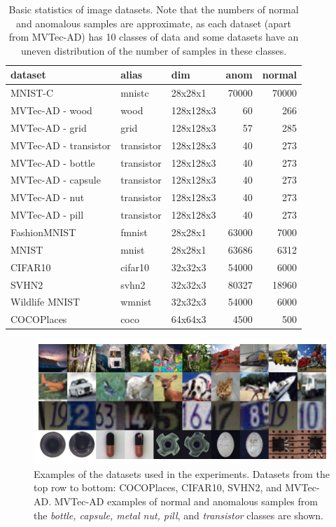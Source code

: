 \begin{table}
    \centering
    \tabcolsep=0.1cm
    \begin{tabular}{lllrr}
    \toprule
    \textbf{dataset} & \textbf{alias} & \textbf{dim} & \textbf{anom} & \textbf{normal} \\
    \midrule
    MNIST-C & mnistc & 28x28x1 & 70000 & 70000 \\
    MVTec-AD - wood & wood & 128x128x3 & 60 & 266 \\
    MVTec-AD - grid & grid & 128x128x3 & 57 & 285 \\
    MVTec-AD - transistor & transistor & 128x128x3 & 40 & 273 \\
    MVTec-AD - bottle & transistor & 128x128x3 & 40 & 273 \\
    MVTec-AD - capsule & transistor & 128x128x3 & 40 & 273 \\
    MVTec-AD - nut & transistor & 128x128x3 & 40 & 273 \\
    MVTec-AD - pill & transistor & 128x128x3 & 40 & 273 \\
    FashionMNIST & fmnist & 28x28x1 & 63000 & 7000   \\
    MNIST & mnist & 28x28x1 & 63686 & 6312  \\
    CIFAR10 & cifar10 & 32x32x3 & 54000 & 6000  \\
    SVHN2 & svhn2 & 32x32x3 & 80327 & 18960  \\
    Wildlife MNIST & wmnist & 32x32x3 & 54000 & 6000  \\
    COCOPlaces & coco & 64x64x3 & 4500 & 500  \\\bottomrule
    \end{tabular}
    \vspace*{0.15cm}
    \caption{Basic statistics of image datasets. Note that the numbers of normal and anomalous samples are approximate, as each dataset (apart from MVTec-AD) has 10 classes of data and some datasets have an uneven distribution of the number of samples in these classes.}
    \label{tab:image_datasets}
\end{table}
    

\begin{figure}
    \centering
    \includegraphics[width=\textwidth]{data/chapter_sgvaegan/fig5_all_grid.png}
    \caption{Examples of the datasets used in the experiments. Datasets from the top row to bottom: COCOPlaces, CIFAR10, SVHN2, and MVTec-AD. MVTec-AD examples of normal and anomalous samples from the \textit{bottle, capsule, metal nut, pill}, and \textit{transistor} classes are shown.}
    \label{fig:all_grid}
\end{figure}
